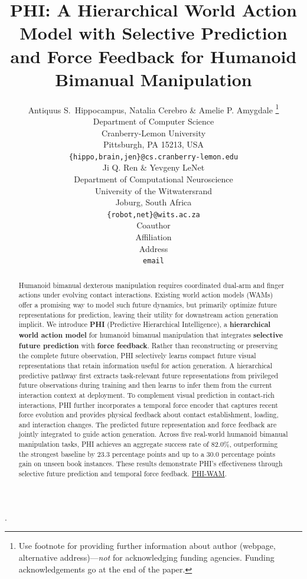 \documentclass{article} %
\title{PHI: A Hierarchical World Action Model with Selective Prediction and Force Feedback for Humanoid Bimanual Manipulation}
\author{Antiquus S.~Hippocampus, Natalia Cerebro \& Amelie P. Amygdale \thanks{ Use footnote for providing further information
about author (webpage, alternative address)---\emph{not} for acknowledging
funding agencies.  Funding acknowledgements go at the end of the paper.} \\
Department of Computer Science\\
Cranberry-Lemon University\\
Pittsburgh, PA 15213, USA \\
\texttt{\{hippo,brain,jen\}@cs.cranberry-lemon.edu} \\
\And
Ji Q. Ren \& Yevgeny LeNet \\
Department of Computational Neuroscience \\
University of the Witwatersrand \\
Joburg, South Africa \\
\texttt{\{robot,net\}@wits.ac.za} \\
\AND
Coauthor \\
Affiliation \\
Address \\
\texttt{email}
}
\begin{document}
\setlength{\floatsep}{6pt plus 2pt minus 2pt}.

\maketitle


\begin{abstract}

Humanoid bimanual dexterous manipulation requires coordinated dual-arm and finger actions under evolving contact interactions. Existing world action models (WAMs) offer a promising way to model such future dynamics, but primarily optimize future representations for prediction, leaving their utility for downstream action generation implicit. We introduce \textbf{PHI} (Predictive Hierarchical Intelligence), a \textbf{hierarchical world action model} for humanoid bimanual manipulation that integrates \textbf{selective future prediction} with \textbf{force feedback}. Rather than reconstructing or preserving the complete future observation, PHI selectively learns compact future visual representations that retain information useful for action generation. A hierarchical predictive pathway first extracts task-relevant future representations from privileged future observations during training and then learns to infer them from the current interaction context at deployment. To complement visual prediction in contact-rich interactions, PHI further incorporates a temporal force encoder that captures recent force evolution and provides physical feedback about contact establishment, loading, and interaction changes. The predicted future representation and force feedback are jointly integrated to guide action generation. Across five real-world humanoid bimanual manipulation tasks, PHI achieves an aggregate success rate of 82.0\%, outperforming the strongest baseline by 23.3 percentage points and up to a 30.0 percentage points gain on unseen book instances. These results demonstrate PHI's effectiveness through selective future prediction and temporal force feedback. \href{https://phi-wam.github.io/}{PHI-WAM}.






\end{abstract}
\end{document}
